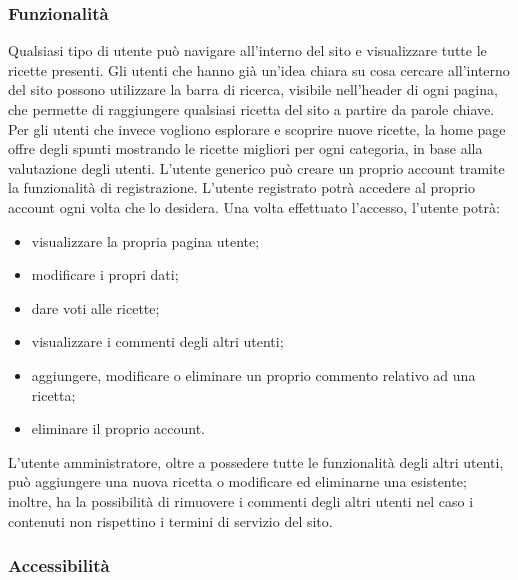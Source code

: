 \subsubsection{Funzionalità}
\label{subs:funzionalità}
Qualsiasi tipo di utente può navigare all'interno del sito e visualizzare tutte le ricette presenti.
Gli utenti che hanno già un'idea chiara su cosa cercare all'interno del sito possono utilizzare la barra di ricerca, visibile nell'header di ogni pagina, che permette di raggiungere qualsiasi ricetta del sito a partire da parole chiave. Per gli utenti che invece vogliono esplorare e scoprire nuove ricette, la home page offre degli spunti mostrando le ricette migliori per ogni categoria, in base alla valutazione degli utenti. \newline
L'utente generico può creare un proprio account tramite la funzionalità di registrazione. L'utente registrato potrà accedere al proprio account ogni volta che lo desidera. Una volta effettuato l'accesso, l'utente potrà:
\begin{itemize}
    \item visualizzare la propria pagina utente;
    \item modificare i propri dati;
    \item dare voti alle ricette;
    \item visualizzare i commenti degli altri utenti;
    \item aggiungere, modificare o eliminare un proprio commento relativo ad una ricetta;
    \item eliminare il proprio account.
\end{itemize}
L'utente amministratore, oltre a possedere tutte le funzionalità degli altri utenti, può aggiungere una nuova ricetta o modificare ed eliminarne una esistente; inoltre, ha la possibilità di rimuovere i commenti degli altri utenti nel caso i contenuti non rispettino i termini di servizio del sito.

\subsubsection{Accessibilità}
\label{subs:accessibilità}

